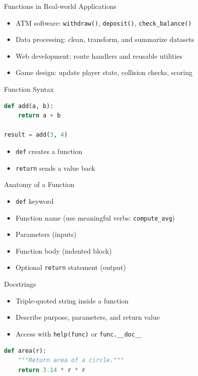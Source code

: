 \documentclass{beamer}
\begin{document}
\begin{frame}[fragile]{Functions in Real-world Applications}
  \begin{itemize}[<+->]
    \item ATM software: \texttt{withdraw()}, \texttt{deposit()}, \texttt{check\_balance()}
    \item Data processing: clean, transform, and summarize datasets
    \item Web development: route handlers and reusable utilities
    \item Game design: update player state, collision checks, scoring
  \end{itemize}
\end{frame}

\begin{frame}[fragile]{Function Syntax}
  \begin{lstlisting}[language=Python]
def add(a, b):
    return a + b

result = add(3, 4)
  \end{lstlisting}
  \begin{itemize}[<+->]
    \item \texttt{def} creates a function
    \item \texttt{return} sends a value back
  \end{itemize}
\end{frame}

\begin{frame}[fragile]{Anatomy of a Function}
  \begin{itemize}[<+->]
    \item \texttt{def} keyword
    \item Function name (use meaningful verbs: \texttt{compute\_avg})
    \item Parameters (inputs)
    \item Function body (indented block)
    \item Optional \texttt{return} statement (output)
  \end{itemize}
\end{frame}

\begin{frame}[fragile]{Docstrings}
  \begin{itemize}[<+->]
    \item Triple-quoted string inside a function
    \item Describe purpose, parameters, and return value
    \item Access with \texttt{help(func)} or \texttt{func.\_\_doc\_\_}
  \end{itemize}
  \vspace{0.4em}
  \begin{lstlisting}[language=Python]
def area(r):
    """Return area of a circle."""
    return 3.14 * r * r
  \end{lstlisting}
\end{frame}
\end{document}
